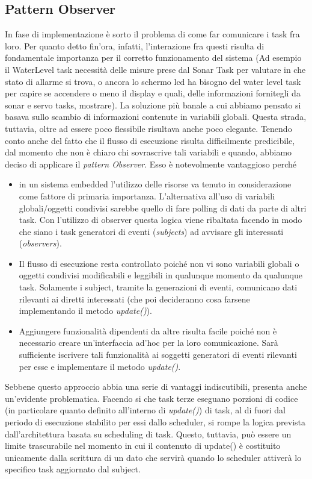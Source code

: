 \documentclass[a4paper,12pt]{report}
\begin{document}
\subsection{Pattern Observer}
In fase di implementazione è sorto il problema di come far comunicare i task fra loro. Per quanto detto fin'ora, infatti, l'interazione fra questi risulta di fondamentale importanza per il corretto funzionamento del sistema (Ad esempio il WaterLevel task necessità delle misure prese dal Sonar Task per valutare in che stato di allarme si trova, o ancora lo schermo lcd ha bisogno del water level task per capire se accendere o meno il display e quali, delle informazioni fornitegli da sonar e servo tasks, mostrare). 
La soluzione più banale a cui abbiamo pensato si basava sullo scambio di informazioni contenute in variabili globali. Questa strada, tuttavia, oltre ad essere poco flessibile risultava anche poco elegante. Tenendo conto anche del fatto che il flusso di esecuzione risulta difficilmente predicibile, dal momento che non è chiaro chi sovrascrive tali variabili e quando, abbiamo deciso di applicare il \emph{pattern Observer}. Esso è notevolmente vantaggioso perché
\begin{itemize}
    \item in un sistema embedded l'utilizzo delle risorse va tenuto in considerazione come fattore di primaria importanza. L'alternativa all'uso di variabili globali/oggetti condivisi sarebbe quello di fare polling di dati da parte di altri task.
    Con l'utilizzo di observer questa logica viene ribaltata facendo in modo che siano i task generatori di eventi (\emph{subjects}) ad avvisare gli interessati (\emph{observers}).
    \item Il flusso di esecuzione resta controllato poiché non vi sono variabili globali o oggetti condivisi modificabili e leggibili in qualunque momento da qualunque task. Solamente i subject, tramite la generazioni di eventi, comunicano dati rilevanti ai diretti interessati (che poi decideranno cosa farsene implementando il metodo \emph{update()}).
    \item Aggiungere funzionalità dipendenti da altre risulta facile poiché non è necessario creare un'interfaccia ad'hoc per la loro comunicazione. Sarà sufficiente iscrivere tali funzionalità ai soggetti generatori di eventi rilevanti per esse e implementare il metodo \emph{update()}.
\end{itemize}
Sebbene questo approccio abbia una serie di vantaggi indiscutibili, presenta anche un'evidente problematica. Facendo si che task terze eseguano porzioni di codice (in particolare quanto definito all'interno di \emph{update()}) di task, al di fuori dal periodo di esecuzione stabilito per essi dallo scheduler, si rompe la logica prevista dall'architettura basata su scheduling di task.
Questo, tuttavia, può essere un limite trascurabile nel momento in cui il contenuto di update() è costituito unicamente dalla scrittura di un dato che servirà quando lo scheduler attiverà lo specifico task aggiornato dal subject.
\end{document}
